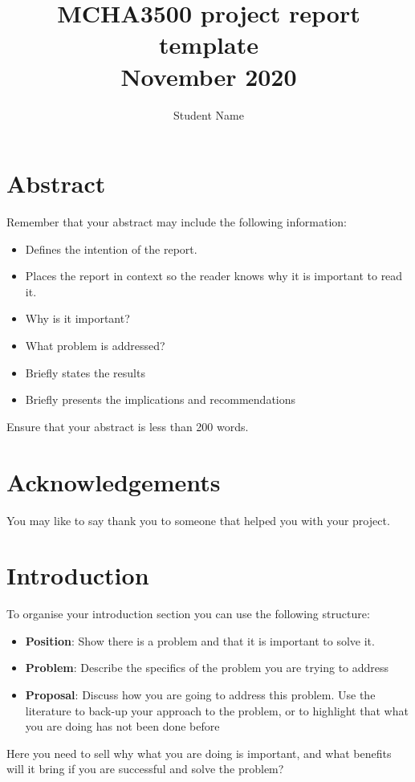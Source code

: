 \documentclass{UoNMCHA}
\numberwithin{equation}{section}
\begin{document}
\title{MCHA3500 project report template \\
{\small November 2020}}
\author[UoNMCHA]{Student Name}
\address[UoNMCHA]{
Student of Mechatronics Engineering,\\
The University of Newcastle, Callaghan, NSW 2308, AUSTRALIA \\
Student Number: 3...... \\
E-mail: \href{mailto:First.Last@uon.edu.au}{\textsf{First.Last@uon.edu.au}}}
\maketitle
\onecolumn

\vspace{-5mm}
\section*{Abstract}
\vspace{-3mm}
Remember that your abstract may include the following information:
\begin{itemize}
    \item Defines the intention of the report.
    \item Places the report in context so the reader knows why it is important to read it.
    \item Why is it important?
    \item What problem is addressed?
    \item Briefly states the results
    \item Briefly presents the implications and recommendations
\end{itemize}
Ensure that your abstract is less than 200 words.
\vspace{-2mm}
\section*{Acknowledgements}
\vspace{-3mm}
You may like to say thank you to someone that helped you with your project.
\newpage
\tableofcontents
\newpage
\section{Introduction}
To organise your introduction section you can use the following structure:
\begin{itemize}
    \item \textbf{Position}: Show there is a problem and that it is important to solve it.
    \item \textbf{Problem}: Describe the specifics of the problem you are trying to address
    \item \textbf{Proposal}: Discuss how you are going to address this problem. Use the literature to back-up your approach to the problem, or to highlight that what you are doing has not been done before
\end{itemize}
Here you need to sell why what you are doing is important, and what benefits will it bring if you are successful and solve the problem? 
%
\end{document}
